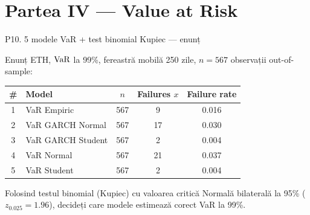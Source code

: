 \documentclass[9pt, aspectratio=169, t]{beamer}
\begin{document}
\section{Partea IV --- Value at Risk}

\begin{frame}{P10. 5 modele VaR + test binomial Kupiec --- enunț}
\begin{block}{Enunț}
ETH, $\text{VaR}$ la 99\%, fereastră mobilă 250 zile, $n=567$ observații out-of-sample:
\begin{center}\small
\begin{tabular}{clccc}\toprule
\# & Model & $n$ & Failures $x$ & Failure rate\\\midrule
1 & VaR Empiric          & 567 & 9  & 0.016\\
2 & VaR GARCH Normal     & 567 & 17 & 0.030\\
3 & VaR GARCH Student    & 567 & 2  & 0.004\\
4 & VaR Normal           & 567 & 21 & 0.037\\
5 & VaR Student          & 567 & 2  & 0.004\\\bottomrule
\end{tabular}
\end{center}
Folosind testul binomial (Kupiec) cu valoarea critică Normală bilaterală la 95\% ($z_{0.025}=1.96$), decideți care modele estimează corect VaR la 99\%.
\end{block}
\end{frame}
\end{document}
